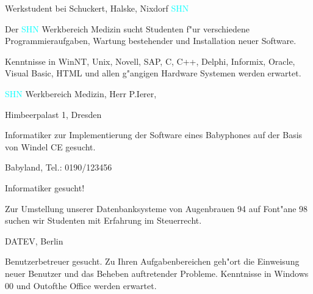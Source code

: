 \documentclass[a4paper, 12pt]{article}
\begin{document}
\vskip 5cm

  { \sf 
 
  { \Large  Werkstudent bei Schuckert, Halske, Nixdorf  \hfill \textcolor{cyan}{SHN}}

  \bigskip

  Der \textcolor{cyan}{SHN} Werkbereich Medizin sucht Studenten f"ur
  verschiedene Programmieraufgaben, Wartung bestehender und Installation
  neuer Software.

  \medskip

  Kenntnisse in WinNT, Unix, Novell, SAP, C, C++, Delphi, Informix, Oracle,
    Visual Basic, HTML und allen g"angigen Hardware Systemen werden erwartet.

  \medskip

  \hfill \textcolor{cyan}{SHN} Werkbereich Medizin, Herr P.Ierer, 
  
  \hfill Himbeerpalast 1, Dresden

  }
 
\vskip 5cm 

  { \unitalic \baselineskip 16pt

  Informatiker zur Implementierung der Software
  eines Babyphones auf der Basis von Windel CE gesucht.

  \bigskip

  \hfill                     Babyland, Tel.: 0190/123456

  }

\vskip 5cm

  { \avantg \baselineskip 17pt

  Informatiker gesucht!

  \medskip

  Zur Umstellung unserer Datenbanksysteme von Augenbrauen 94
  auf Font"ane 98 suchen wir Studenten mit Erfahrung
  im Steuerrecht. 
        
  \hfill    DATEV, Berlin

  }

\vskip 5cm

  { \large

  Benutzerbetreuer gesucht. Zu Ihren Aufgabenbereichen geh"ort
  die Einweisung neuer Benutzer und das Beheben auftretender Probleme.
  Kenntnisse in Windows 00 und Outofthe Office werden erwartet.

  }

\vskip 5cm
\end{document}
